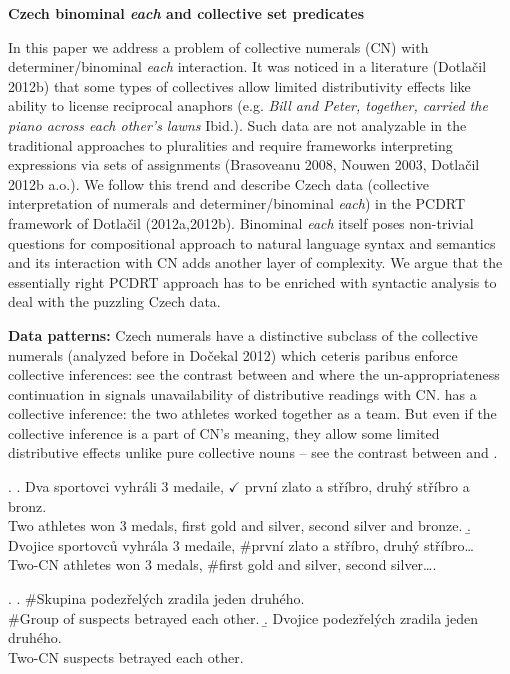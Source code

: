 \documentclass[12pt, a4paper]{scrartcl}
\begin{document}
\begin{center}
\textbf{Czech binominal \textit{each} and collective set predicates}
\end{center}

In this paper we address a problem of collective numerals (CN) with determiner/bi\-no\-mi\-nal \textit{each} interaction. It was noticed in a literature (Dotlačil 2012b) that some types of collectives allow limited distributivity effects like ability to license reciprocal anaphors (e.g. \textit{Bill and Peter, together, carried the piano across each other's lawns} Ibid.). Such data are not analyzable in the traditional approaches to pluralities and require frameworks interpreting expressions via sets of assignments (Brasoveanu 2008, Nouwen 2003, Dotlačil 2012b a.o.). We follow this trend and describe Czech data (collective interpretation of numerals and determiner/binominal \textit{each}) in the PCDRT framework of Dotlačil (2012a,2012b). Binominal \textit{each} itself poses non-trivial questions for compositional approach to natural language syntax and semantics and its interaction with CN adds another layer of complexity. We argue that the essentially right PCDRT approach has to be enriched with syntactic analysis  to deal with the puzzling Czech data.

\textbf{Data patterns:} Czech numerals have a distinctive subclass of the collective numerals (analyzed before in Dočekal 2012) which ceteris paribus enforce collective inferences: see the contrast between \Next[a] and \Next[b] where the un-appropriateness continuation in \Next[b] signals unavailability of distributive readings with CN. \Next[b] has a collective inference: the two athletes worked together as a team. But even if the collective inference is a part of CN's meaning, they allow some limited distributive effects unlike pure collective nouns -- see the contrast between \NNext[a] and \NNext[b].

\ex. \a. Dva sportovci vyhráli 3 medaile, $\checkmark$ první zlato a stříbro, druhý stříbro a bronz.\\
Two athletes won 3 medals, first gold and silver, second silver and bronze.
\b. Dvojice sportovců vyhrála 3 medaile, \#první zlato a stříbro, druhý stříbro\ldots\\
Two-CN athletes won 3 medals, \#first gold and silver, second silver\ldots.

\ex. \a. \#Skupina podezřelých zradila jeden druhého.\\
\#Group of suspects betrayed each other.
\b. Dvojice podezřelých zradila jeden druhého.\\
Two-CN suspects betrayed each other.
\end{document}
